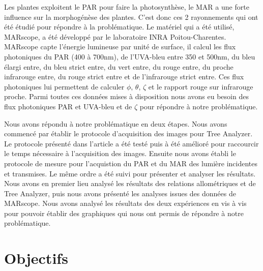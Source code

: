 ﻿\documentclass[12pt]{report}
\begin{document}
Les plantes exploitent le PAR pour faire la photosynthèse, le MAR a une forte
influence sur la morphogénèse des plantes. C'est donc ces 2 rayonnements qui
ont été étudié pour répondre à la problématique. Le matériel qui a été utilisé,
MARscope, a été développé par le laboratoire INRA Poitou-Charentes. MARscope
capte l'énergie lumineuse par unité de surface, il calcul les flux photoniques
du PAR (400 à 700nm), de l'UVA-bleu entre 350 et 500nm, du bleu élargi entre,
du bleu strict entre, du vert entre, du rouge entre, du proche infrarouge entre,
du rouge strict entre et de l'infrarouge strict entre. Ces flux photoniques
lui permettent de calculer $\phi$, $\theta$, $\zeta$ et le rapport rouge sur
infrarouge proche. Parmi toutes ces données mises à disposition nous avons eu
besoin des flux photoniques PAR et UVA-bleu et de $\zeta$ pour répondre à notre
problématique.

Nous avons répondu à notre problématique en deux étapes. Nous avons commencé par
établir le protocole d'acquisition des images pour Tree Analyzer. Le protocole
présenté dans l'article \citet{MAR_ref25} a été testé puis à été amélioré pour
raccourcir le temps nécessaire à l'acquisition des images. Ensuite nous avons
établi le protocole de mesure pour l'acquistion du PAR et du MAR des lumière
incidentes et transmises. Le même ordre a été suivi pour présenter et analyser
les résultats. Nous avons en premier lieu analysé les résultats des relations
allométriques et de Tree Analyzer, puis nous avons présenté les analyses issues
des données de MARscope. Nous avons analysé les résultats des deux expériences
en vis à vis pour pouvoir établir des graphiques qui nous ont permis de répondre
à notre problématique.



\chapter{Objectifs}
\end{document}
